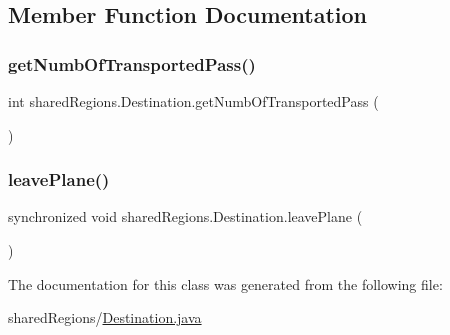 \subsection{Member Function Documentation}
\mbox{\label{classshared_regions_1_1_destination_ac2be96efc235a7cc7e6c7497e37bbe30}} 
\subsubsection{\texorpdfstring{get\+Numb\+Of\+Transported\+Pass()}{getNumbOfTransportedPass()}}
{\footnotesize\ttfamily int shared\+Regions.\+Destination.\+get\+Numb\+Of\+Transported\+Pass (\begin{DoxyParamCaption}{ }\end{DoxyParamCaption})}

\mbox{\label{classshared_regions_1_1_destination_a92d8a597465d7cb29ac87a41407794e7}} 
\subsubsection{\texorpdfstring{leave\+Plane()}{leavePlane()}}
{\footnotesize\ttfamily synchronized void shared\+Regions.\+Destination.\+leave\+Plane (\begin{DoxyParamCaption}{ }\end{DoxyParamCaption})}



The documentation for this class was generated from the following file\+:\begin{DoxyCompactItemize}
\item 
shared\+Regions/\hyperlink{_destination_8java}{Destination.\+java}\end{DoxyCompactItemize}
